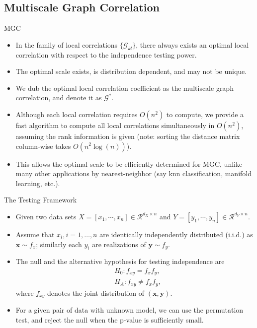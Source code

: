 \documentclass{beamer}
\newcommand{\G}{\mathcal{G}}
\providecommand{\mb}[1]{\boldsymbol{#1}}
\begin{document}
\subsection{Multiscale Graph Correlation}
\begin{frame}{MGC}
\begin{itemize}[<+->]
\item In the family of local correlations $\{\G_{kl}\}$, there always exists an optimal local correlation with respect to the independence testing power. 
\item The optimal scale exists, is distribution dependent, and may not be unique.
\item We dub the optimal local correlation coefficient as the multiscale graph correlation, and denote it as $\G^{*}$.
\item Although each local correlation requires $O(n^2)$ to compute, we provide a fast algorithm to compute all local correlations simultaneously in $O(n^2)$, assuming the rank information is given (note: sorting the distance matrix column-wise takes $O(n^2 \log(n))$).
\item This allows the optimal scale to be efficiently determined for MGC, unlike many other applications by nearest-neighbor (say knn classification, manifold learning, etc.).
\end{itemize}
\end{frame}

\begin{frame}{The Testing Framework}
\begin{itemize}[<+->]
\item Given two data sets $X=[x_{1},\cdots, x_{n}] \in \mathcal{R}^{d_{X} \times n}$ and $Y=[y_{1},\cdots, y_{n}] \in \mathcal{R}^{d_{Y} \times n}$.
\item Assume that $x_{i}, i=1,\ldots,n$ are identically independently distributed (i.i.d.) as $\mb{x} \sim f_{x}$; similarly each $y_{i}$ are realizations of $\mb{y} \sim f_{y}$. 
\item The null and the alternative hypothesis for testing independence are
\begin{align*}
& H_{0}: f_{xy}=f_{x}f_{y},\\
& H_{A}: f_{xy} \neq f_{x}f_{y},
\end{align*}
where $f_{xy}$ denotes the joint distribution of $(\mb{x},\mb{y})$. 
\item For a given pair of data with unknown model, we can use the permutation test, and reject the null when the p-value is sufficiently small.
\end{itemize}
\end{frame}
\end{document}
